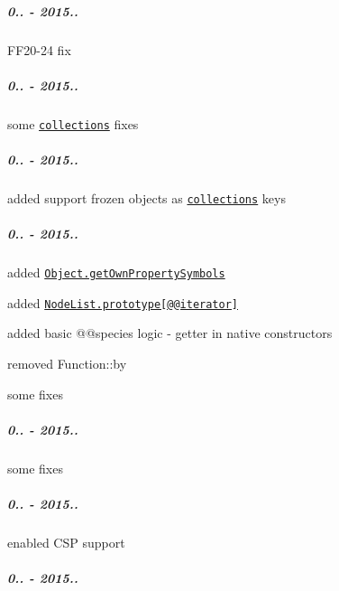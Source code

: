 \subparagraph*{0.. -\/ 2015..}


\begin{DoxyItemize}
\item F\+F20-\/24 fix
\end{DoxyItemize}

\subparagraph*{0.. -\/ 2015..}


\begin{DoxyItemize}
\item some \href{https://github.com/zloirock/core-js/#ecmascript-6-collections}{\tt collections} fixes
\end{DoxyItemize}

\subparagraph*{0.. -\/ 2015..}


\begin{DoxyItemize}
\item added support frozen objects as \href{https://github.com/zloirock/core-js/#ecmascript-6-collections}{\tt collections} keys
\end{DoxyItemize}

\subparagraph*{0.. -\/ 2015..}


\begin{DoxyItemize}
\item added \href{https://github.com/zloirock/core-js/#ecmascript-6-symbol}{\tt {\ttfamily Object.\+get\+Own\+Property\+Symbols}}
\item added \href{https://github.com/zloirock/core-js/#ecmascript-6-iterators}{\tt {\ttfamily Node\+List.\+prototype\mbox{[}@@iterator\mbox{]}}}
\item added basic {\ttfamily @@species} logic -\/ getter in native constructors
\item removed {\ttfamily Function\+::by}
\item some fixes
\end{DoxyItemize}

\subparagraph*{0.. -\/ 2015..}


\begin{DoxyItemize}
\item some fixes
\end{DoxyItemize}

\subparagraph*{0.. -\/ 2015..}


\begin{DoxyItemize}
\item enabled C\+SP support
\end{DoxyItemize}

\subparagraph*{0.. -\/ 2015..}


